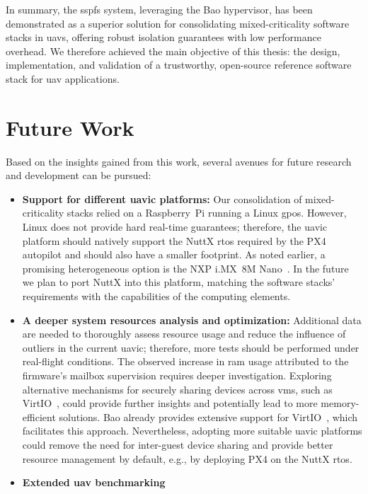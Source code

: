 In summary, the \gls{sspfs} system, leveraging the Bao hypervisor, has been
demonstrated as a superior solution for consolidating mixed-criticality software
stacks in \glspl{uav}, offering robust isolation guarantees with low performance
overhead. We therefore achieved the main objective of this thesis: the design,
implementation, and validation of a trustworthy, open-source reference software
stack for \gls{uav} applications.

\section{Future Work}
Based on the insights gained from this work, several
avenues for future research and development can be
pursued:
\begin{itemize}
\item \textbf{Support for different \gls{uavic} platforms:}
Our consolidation of mixed-criticality stacks relied on a Raspberry~Pi running a
Linux \gls{gpos}. However, Linux does not provide hard real-time guarantees;
therefore, the \gls{uavic} platform should natively support the NuttX \gls{rtos}
required by the PX4 autopilot and should also have a smaller footprint. As noted
earlier, a promising heterogeneous option is the NXP i.MX~8M Nano~\cite{imx8mn}.
In the future we plan to port NuttX into this platform,
matching the software stacks' requirements with the capabilities of the computing elements.
\item \textbf{A deeper system resources analysis and optimization:}
  Additional data are needed to thoroughly assess resource usage and reduce the
  influence of outliers in the current \gls{uavic}; therefore, more tests should
  be performed under real-flight conditions.
  The observed increase
  in \gls{ram} usage attributed to the firmware's mailbox supervision requires
  deeper investigation. Exploring alternative mechanisms for securely sharing
  devices across \glspl{vm}, such as VirtIO~\cite{peixoto-virtio-2024}, could provide further insights and
  potentially lead to more memory-efficient solutions. Bao already provides
  extensive support for VirtIO~\cite{costa2022virtio,ribeiro2023virtio,rocha_mitigating_2023,peixoto-virtio-2024,baoRepo},
  which facilitates this approach. Nevertheless, adopting more suitable
  \gls{uavic} platforms could remove the need for inter-guest device sharing and
  provide better resource management by default, e.g., by deploying PX4
  on the NuttX \gls{rtos}.
\item \textbf{Extended \gls{uav} benchmarking}

\end{itemize}
